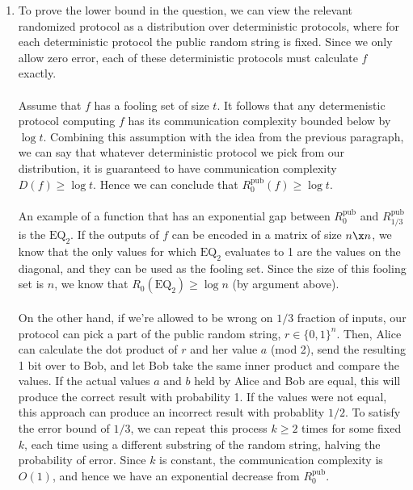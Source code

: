 \documentclass{article}
\begin{document}
\begin{enumerate}

    \item To prove the lower bound in the question, we can view the relevant
        randomized protocol as a distribution over deterministic protocols,
        where for each deterministic protocol the public random string is
        fixed. Since we only allow zero error, each of these deterministic
        protocols must calculate $f$ exactly.
        \\\\
        Assume that $f$ has a fooling set of size $t$. It follows that any
        determenistic protocol computing $f$ has its communication complexity
        bounded below by $\log t$. Combining this assumption with the
        idea from the previous paragraph, we can say that whatever
        deterministic protocol we pick from our distribution, it is guaranteed
        to have communication complexity $D(f) \geq \log t$. Hence we
        can conclude that $R^{\textrm{pub}}_0(f) \geq \log t$.
        \\\\
        An example of a function that has an exponential gap between
        $R^{\textrm{pub}}_0$ and $R^{\textrm{pub}}_{1/3}$ is the
        $\textrm{EQ}_2$. If the outputs of $f$ can be encoded in a matrix of
        size $n \x n$, we know that the only values for which $\textrm{EQ}_2$
        evaluates to 1 are the values on the diagonal, and they can be used as
        the fooling set. Since the size of this fooling set is $n$, we know
        that $R_0(\textrm{EQ}_2) \geq \log n$ (by argument above).
        \\\\
        On the other hand, if we're allowed to be wrong on $1/3$ fraction of
        inputs, our protocol can pick a part of the public random string, $r
        \in \{ 0, 1 \}^n$. Then, Alice can calculate the dot product of $r$ and
        her value $a$ (mod 2), send the resulting 1 bit over to Bob, and let
        Bob take the same inner product and compare the values. If the actual
        values $a$ and $b$ held by Alice and Bob are equal, this will produce
        the correct result with probability 1. If the values were not equal,
        this approach can produce an incorrect result with probablity $1/2$. To
        satisfy the error bound of $1/3$, we can repeat this process $k \geq 2$
        times for some fixed $k$, each time using a different substring of the
        random string, halving the probability of error. Since $k$ is constant,
        the communication complexity is $O(1)$, and hence we have an
        exponential decrease from $R^{\textrm{pub}}_0$.
        \\


\end{enumerate}
\end{document}
